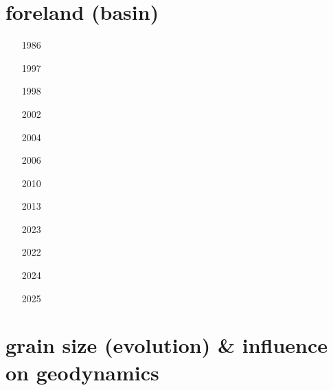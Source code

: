 \section{foreland (basin)} 

\begin{small}
\begin{itemize}
\item[1986]  
\item[1997] 
\item[1998]  
\item[2002]  \\  
\item[2004]  
\item[2006]  \\ 
\item[2010] 
\item[2013]  
\item[2023]  
\item[2022] 
\item[2024] 
\item[2025]  
\end{itemize}
\end{small}







\section{grain size (evolution) \& influence on geodynamics}\label{sec:topics:gsev}

